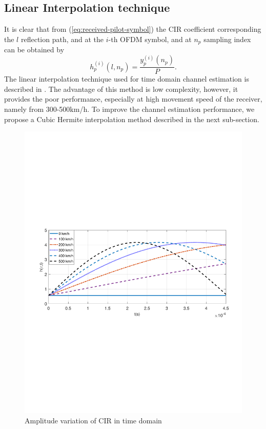 \documentclass[AMA]{WileyNJD-v1}
\begin{document}
\subsection{Linear Interpolation technique}
It is clear that from (\ref{eq:received-pilot-symbol}) the CIR coefficient corresponding the $l$ reflection path, and at the $i$-th OFDM symbol, and  at $n_p$ sampling index  can be obtained by
%
\begin{equation}\label{eq:CIR-at-pilot}
	h^{(i)}_{p}(l,n_p)= \dfrac{y^{(i)}_{p}(n_p)}{P}.
\end{equation}
%
The linear interpolation technique used for time domain channel estimation is described in \cite{Jeon1999}. The advantage of this method is low complexity, however, it provides the poor performance, especially at high movement speed of the receiver, namely from 300-500km/h. To improve the channel estimation performance, we propose a Cubic Hermite interpolation method described in the next sub-section.
%
	\begin{figure}
		\centering
		\includegraphics[width=1.0\linewidth]{"figures/CIR_variation_speed"}
		\caption{Amplitude variation of CIR  in time domain}
		\label{fig:cir-variation}
	\end{figure}
	
\end{document}
